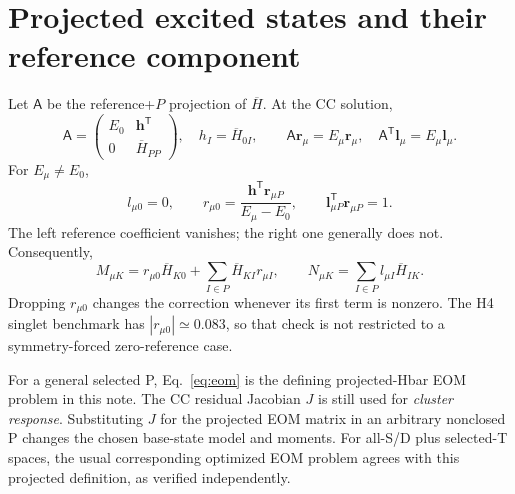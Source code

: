 \documentclass[11pt,letterpaper]{article}
\numberwithin{equation}{section}
\newcommand{\bH}{\overline H}
\newcommand{\T}{\mathsf T}
\begin{document}
\section{Projected excited states and their reference component}
Let $\mathsf A$ be the reference+$P$ projection of $\bH$. At the CC solution,
\begin{equation}
 \mathsf A=\begin{pmatrix}E_0&\bm h^{\T}\\0&\bH_{PP}\end{pmatrix},
 \quad h_I=\bH_{0I},\qquad
 \mathsf A\bm r_\mu=E_\mu\bm r_\mu,\quad
 \mathsf A^{\T}\bm l_\mu=E_\mu\bm l_\mu.
 \label{eq:eom}
\end{equation}
For $E_\mu\ne E_0$,
\begin{equation}
 l_{\mu0}=0,\qquad
 r_{\mu0}=\frac{\bm h^{\T}\bm r_{\mu P}}{E_\mu-E_0},\qquad
 \bm l_{\mu P}^{\T}\bm r_{\mu P}=1.
 \label{eq:r0}
\end{equation}
The left reference coefficient vanishes; the right one generally does not.
Consequently,
\begin{equation}
 M_{\mu K}=r_{\mu0}\bH_{K0}+\sum_{I\in P}\bH_{KI}r_{\mu I},\qquad
 N_{\mu K}=\sum_{I\in P}l_{\mu I}\bH_{IK}.
 \label{eq:r0moment}
\end{equation}
Dropping $r_{\mu0}$ changes the correction whenever its first term is
nonzero. The H4 singlet benchmark has $|r_{\mu0}|\simeq0.083$, so that check
is not restricted to a symmetry-forced zero-reference case.

For a general selected P, Eq.~\eqref{eq:eom} is the defining projected-Hbar
EOM problem in this note. The CC residual Jacobian $J$ is still used for
\emph{cluster response}. Substituting $J$ for the projected EOM matrix in
an arbitrary nonclosed P changes the chosen base-state model and moments.
For all-S/D plus selected-T spaces, the usual corresponding optimized EOM
problem agrees with this projected definition, as verified independently.
\end{document}
